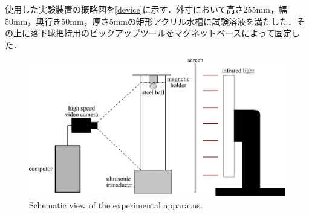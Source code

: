 使用した実験装置の概略図を\ref{device}に示す．外寸において高さ255mm，幅50mm，奥行き50mm，厚さ5mmの矩形アクリル水槽に試験溶液を満たした．その上に落下球把持用のピックアップツールをマグネットベースによって固定した．
\begin{center}
    \begin{figure}[H]
        \includegraphics[clip,width=15.0cm]{2-Methods/device.png}
        \caption{Schematic view of the experimental apparatus.}
        \label{fig:device}
    \end{figure}
\end{center}
